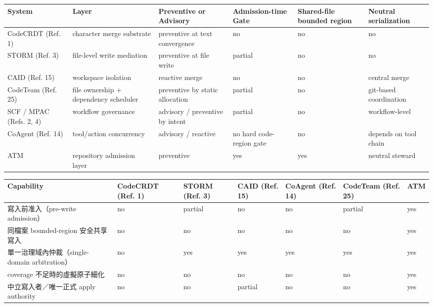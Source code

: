 \documentclass[a4paper,fontset=none]{ctexart}
\begin{document}
\begingroup
\footnotesize
{}
\begin{longtable}{L{0.15\textwidth}L{0.15\textwidth}L{0.15\textwidth}L{0.15\textwidth}L{0.15\textwidth}L{0.15\textwidth}}
\toprule
System & Layer & Preventive or Advisory & Admission-time Gate & Shared-file bounded region & Neutral serialization \\
\midrule
CodeCRDT (Ref. 1) & character merge substrate & preventive at text convergence & no & no & no \\
STORM (Ref. 3) & file-level write mediation & preventive at file write & partial & no & no \\
CAID (Ref. 15) & workspace isolation & reactive merge & no & no & central merge \\
CodeTeam (Ref. 25) & file ownership + dependency scheduler & preventive by static allocation & partial & no & git-based coordination \\
SCF / MPAC (Refs. 2, 4) & workflow governance & advisory / preventive by intent & partial & no & workflow-level \\
CoAgent (Ref. 14) & tool/action concurrency & advisory / reactive & no hard code-region gate & no & depends on tool chain \\
ATM & repository admission layer & preventive & yes & yes & neutral steward \\
\bottomrule
\end{longtable}
\endgroup

\smallskip{}\par\smallskip

\begingroup
\footnotesize
{}
\begin{longtable}{L{0.13\textwidth}L{0.13\textwidth}L{0.13\textwidth}L{0.13\textwidth}L{0.13\textwidth}L{0.13\textwidth}L{0.13\textwidth}}
\toprule
Capability & CodeCRDT (Ref. 1) & STORM (Ref. 3) & CAID (Ref. 15) & CoAgent (Ref. 14) & CodeTeam (Ref. 25) & ATM \\
\midrule
寫入前准入（pre-write admission） & no & partial & no & no & partial & yes \\
同檔案 bounded-region 安全共享寫入 & no & no & no & no & no & yes \\
單一治理域內仲裁（single-domain arbitration） & no & yes & yes & yes & yes & yes \\
coverage 不足時的虛擬原子細化 & no & no & no & no & no & yes \\
中立寫入者／唯一正式 apply authority & no & no & partial & no & no & yes \\
\bottomrule
\end{longtable}
\endgroup
\end{document}
